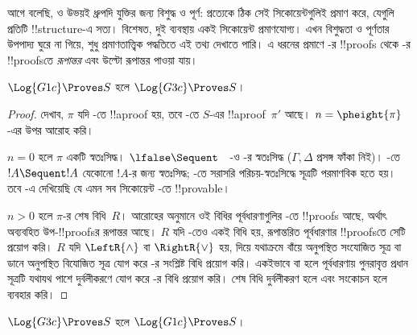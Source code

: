 \documentclass[../../../include/open-logic-section]{subfiles}
\begin{document}


আগে বলেছি,  ও 
উভয়ই ধ্রুপদি যুক্তির জন্য বিশুদ্ধ ও পূর্ণ: প্রত্যেকে
ঠিক সেই সিকোয়েন্টগুলিই প্রমাণ করে, যেগুলি প্রতিটি
!!{structure}-এ সত্য। বিশেষত, দুই ব্যবস্থায় একই
সিকোয়েন্ট প্রমাণযোগ্য। এখন বিশুদ্ধতা ও পূর্ণতার
উপপাদ্য ঘুরে না গিয়ে, শুধু প্রমাণতাত্ত্বিক পদ্ধতিতে
এই তথ্য দেখাতে পারি। এ ধরনের প্রমাণে
-র !!{proof}s থেকে
-র !!{proof}sতে
\emph{রূপান্তর} এবং উল্টো রূপান্তর পাওয়া যায়।

\begin{prop}
$\Log{G1c} \Proves S$ হলে $\Log{G3c} \Proves S$।
\end{prop}

\begin{proof}
  দেখাব, $\pi$ যদি -তে !!a{proof} হয়,
  তবে -তে $S$-এর !!a{proof}~$\pi'$
  আছে। $n = \pheight{\pi}$-এর উপর আরোহ করি।

  $n = 0$ হলে $\pi$ একটি স্বতঃসিদ্ধ।
  $\lfalse \Sequent \quad$-ও
  -র স্বতঃসিদ্ধ ($\Gamma, \Delta$
  প্রসঙ্গ ফাঁকা নিই)। -তে
  $!A \Sequent !A$ যেকোনো $!A$-র জন্য
  স্বতঃসিদ্ধ; -তে সরাসরি
  পরিচয়-স্বতঃসিদ্ধে সূত্রটি পরমাণবিক হতে হয়।
  তবে -এ
  দেখিয়েছি যে এমন সব সিকোয়েন্ট
  -তে !!{provable}।

  $n>0$ হলে $\pi$-র শেষ বিধি~$R$।
  আরোহের অনুমানে ওই বিধির পূর্বধারণাগুলির
  -তে !!{proof}s আছে, অর্থাৎ
  অব্যবহিত উপ-!!{proof}sর রূপান্তর আছে।
  $R$ যদি -তেও একই বিধি হয়,
  রূপান্তরিত পূর্বধারণার !!{proof}sতে
  সেটি প্রয়োগ করি। $R$ যদি
  $\LeftR{\land}$ বা $\RightR{\lor}$
  হয়, 
  দিয়ে যথাক্রমে বাঁয়ে অনুপস্থিত সংযোজিত
  সূত্র বা ডানে অনুপস্থিত বিযোজিত সূত্র
  যোগ করে -র সংশ্লিষ্ট বিধি
  প্রয়োগ করি। একইভাবে
  \LeftR{\lforall} বা \RightR{\lexists}
  হলে পূর্বধারণায় পুনরাবৃত্ত প্রধান
  সূত্রটি যথাযথ পাশে দুর্বলীকরণে যোগ
  করে -র বিধি প্রয়োগ করি।
  শেষ বিধি দুর্বলীকরণ হলে
  এবং সংকোচন হলে
  ব্যবহার করি।
\end{proof}

\begin{prop}
$\Log{G3c} \Proves S$ হলে $\Log{G1c} \Proves S$।
\end{prop}
\end{document}
